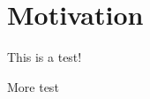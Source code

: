 \documentclass[crop=false]{standalone}
\begin{document}
\section{Motivation}

This is a test! \cite{bernays14}

More test

\ifstandalone
  \printbibliography
\fi
    
\end{document}
